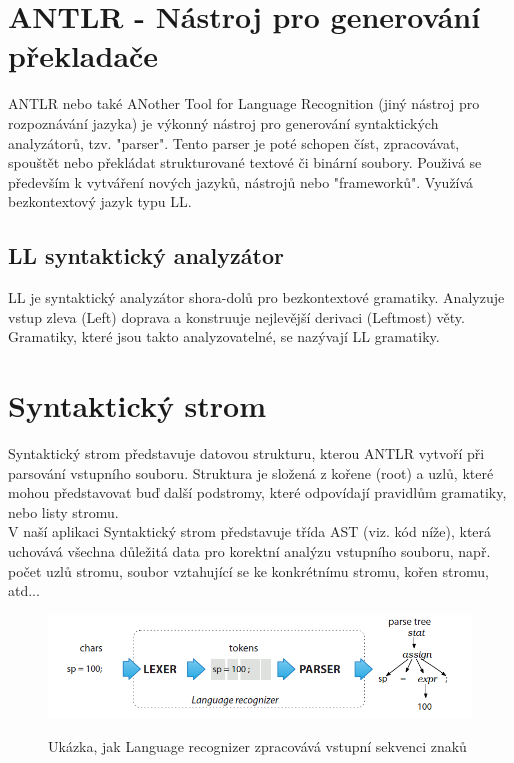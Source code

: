 \section{ANTLR - Nástroj pro generování překladače}
ANTLR nebo také ANother Tool for Language Recognition (jiný nástroj pro rozpoznávání jazyka) \cite{ANTLR_2021} je výkonný nástroj pro generování syntaktických analyzátorů, tzv. "parser". Tento parser je poté schopen číst, zpracovávat, spouštět nebo překládat strukturované textové či binární soubory. Použivá se především k vytváření nových jazyků, nástrojů nebo "frameworků". Využívá bezkontextový jazyk typu LL.
\subsection{LL syntaktický analyzátor}
LL \cite{LL_2017} je syntaktický analyzátor shora-dolů pro bezkontextové gramatiky. Analyzuje vstup zleva (Left) doprava a konstruuje nejlevější derivaci (Leftmost) věty. Gramatiky, které jsou takto analyzovatelné, se nazývají LL gramatiky.

\section{Syntaktický strom}
Syntaktický strom představuje datovou strukturu, kterou ANTLR vytvoří při parsování vstupního souboru. Struktura je složená z kořene (root) a uzlů, které mohou představovat buď další podstromy, které odpovídají pravidlům gramatiky, nebo listy stromu.\\ 
V naší aplikaci Syntaktický strom představuje třída AST (viz. kód níže), která uchovává všechna důležitá data pro korektní analýzu vstupního souboru, např. počet uzlů stromu, soubor vztahující se ke konkrétnímu stromu, kořen stromu, atd...

\begin{figure}
	\centering
	\includegraphics[scale=0.7]{images/parser}
	\caption{Ukázka, jak Language recognizer zpracovává vstupní sekvenci znaků} 			    \cite{ANTLR_PG_10}
	\label{img:parser}
\end{figure}



